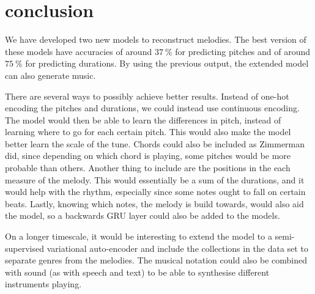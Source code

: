 \section{conclusion}
\label{sec:conclusion}

We have developed two new models to reconstruct melodies.
The best version of these models have accuracies of around $\SI{37}{\%}$ for predicting pitches and of around $\SI{75}{\%}$ for predicting durations.
By using the previous output, the extended model can also generate music.

There are several ways to possibly achieve better results.
Instead of one-hot encoding the pitches and durations, we could instead use continuous encoding.
The model would then be able to learn the differences in pitch, instead of learning where to go for each certain pitch.
This would also make the model better learn the scale of the tune.
Chords could also be included as Zimmerman \cite{Zimmerman2016} did, since depending on which chord is playing, some pitches would be more probable than others.
Another thing to include are the positions in the each measure of the melody. This would essentially be a sum of the durations, and it would help with the rhythm, especially since some notes ought to fall on certain beats.
Lastly, knowing which notes, the melody is build towards, would also aid the model, so a backwards GRU layer could also be added to the models.

On a longer timescale, it would be interesting to extend the model to a semi-supervised variational auto-encoder and include the collections in the data set to separate genres from the melodies.
The musical notation could also be combined with sound (as with speech and text) to be able to synthesise different instruments playing.
